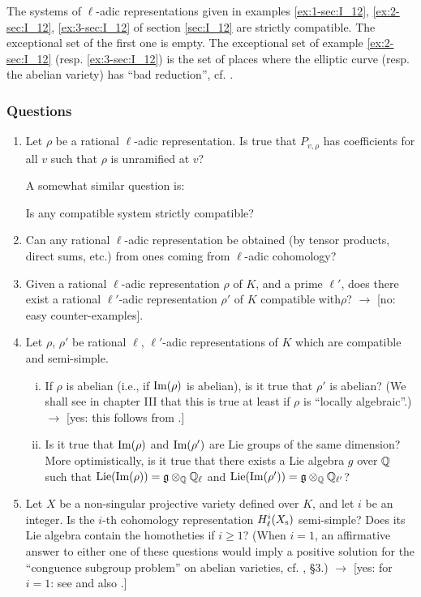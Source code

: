 \begin{ex}
The systems of $\ell$-adic representations given in examples \ref{ex:1-sec:I_12}, \ref{ex:2-sec:I_12}, \ref{ex:3-sec:I_12} of section \ref{sec:I_12} are strictly compatible. The exceptional set of the first one is empty. The exceptional set of example \ref{ex:2-sec:I_12} (resp. \ref{ex:3-sec:I_12}) is the set of places where the elliptic curve (resp. the abelian variety) has ``bad reduction'', cf. \cite{32}.
\end{ex}

\subsubsection*{Questions}
\begin{enumerate}
	\item Let $\rho$ be a rational $\ell$-adic representation. Is true that $P_{v,\rho}$ has coefficients for all $v$ such that $\rho$ is unramified at $v$?

A somewhat similar question is:

	Is any compatible system strictly compatible?
	\item Can any rational $\ell$-adic representation be obtained (by tensor products, direct sums, etc.) from ones coming from $\ell$-adic cohomology?
	\item Given a rational $\ell$-adic representation $\rho$ of $K$, and a prime $\ell'$, does there exist a rational $\ell'$-adic representation $\rho'$ of $K$ compatible with\break $\rho$? $\rightarrow$ [no: easy counter-examples].
	\item Let $\rho$, $\rho'$ be rational $\ell$, $\ell'$-adic representations of $K$ which are compatible and semi-simple.
	\begin{enumerate}[(i)]
		\item If $\rho$ is abelian (i.e., if $\operatorname{Im}(\rho)$ is abelian), is it true that $\rho'$ is abelian? (We shall see in chapter III that this is true at least if $\rho$ is ``locally algebraic''.) $\rightarrow$ [yes: this follows from \cite{36}.]
		\item Is it true that $\operatorname{Im}(\rho)$ and $\operatorname{Im}(\rho')$ are Lie groups of the
\dpage		
		same dimension? More optimistically, is it true that there exists a Lie algebra $g$ over $\mathbb{Q}$ such that $\operatorname{Lie}(\operatorname{Im}(\rho)) = \mathfrak{g} \otimes_{\mathbb{Q}} \mathbb{Q}_{\ell}$ and $\operatorname{Lie}(\operatorname{Im}(\rho')) = \mathfrak{g} \otimes_{\mathbb{Q}} \mathbb{Q}_{\ell'}$?
	\end{enumerate}
	\item Let $X$ be a non-singular projective variety defined over $K$, and
	let $i$ be an integer. Is the $i$-th cohomology representation $H_\ell^i(X_{\mathrm{s}})$ semi-simple? Does its Lie algebra contain the homotheties if $i\geq1$? (When $i=1$, an affirmative answer to either one of these questions would imply a positive solution for the ``conguence subgroup problem'' on abelian varieties, cf. \cite{24}, \S3.) $\rightarrow$ [yes: for $i=1$: see \cite{48} and also \cite{75}.]
\end{enumerate}

